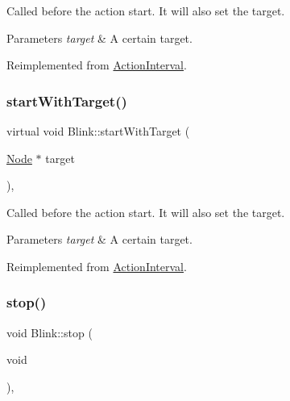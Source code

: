 Called before the action start. It will also set the target.


\begin{DoxyParams}{Parameters}
{\em target} & A certain target. \\
\hline
\end{DoxyParams}


Reimplemented from \hyperlink{classActionInterval_ad3d91186b2c3108488ddbbdbbd982484}{Action\+Interval}.

\mbox{\label{classBlink_aba011d756d22e0094d87a70d9ae6c613}} 
\subsubsection{\texorpdfstring{start\+With\+Target()}{startWithTarget()}\hspace{0.1cm}{\footnotesize\ttfamily [2/2]}}
{\footnotesize\ttfamily virtual void Blink\+::start\+With\+Target (\begin{DoxyParamCaption}\item[{\hyperlink{classNode}{Node} $\ast$}]{target }\end{DoxyParamCaption})\hspace{0.3cm}{\ttfamily [override]}, {\ttfamily [virtual]}}

Called before the action start. It will also set the target.


\begin{DoxyParams}{Parameters}
{\em target} & A certain target. \\
\hline
\end{DoxyParams}


Reimplemented from \hyperlink{classActionInterval_ad3d91186b2c3108488ddbbdbbd982484}{Action\+Interval}.

\mbox{\label{classBlink_ac2299db1e757e2911e35ee9c88fc477c}} 
\subsubsection{\texorpdfstring{stop()}{stop()}\hspace{0.1cm}{\footnotesize\ttfamily [1/2]}}
{\footnotesize\ttfamily void Blink\+::stop (\begin{DoxyParamCaption}\item[{void}]{ }\end{DoxyParamCaption})\hspace{0.3cm}{\ttfamily [override]}, {\ttfamily [virtual]}}

